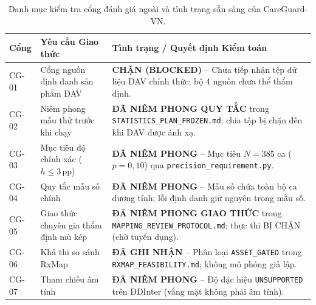 \documentclass[11pt]{article}
\begin{document}
\begin{table}[H]
\centering
\caption{Danh mục kiểm tra cổng đánh giá ngoài và tình trạng sẵn sàng của CareGuard-VN.}
\label{tab:gate_status_vi}
\small
\begin{tabularx}{\textwidth}{lp{4.2cm}X}
\toprule
\textbf{Cổng} & \textbf{Yêu cầu Giao thức} & \textbf{Tình trạng / Quyết định Kiểm toán} \\
\midrule
CG-01 & Cổng nguồn định danh sản phẩm DAV & \textbf{CHẶN (BLOCKED)} -- Chưa tiếp nhận tệp dữ liệu DAV chính thức; bộ 4 nguồn chưa thể thẩm định. \\
CG-02 & Niêm phong mẫu thử trước khi chạy & \textbf{ĐÃ NIÊM PHONG QUY TẮC} trong \texttt{STATISTICS\_PLAN\_FROZEN.md}; chia tập bị chặn đến khi DAV được ánh xạ. \\
CG-03 & Mục tiêu độ chính xác ($h \le 3\,\text{pp}$) & \textbf{ĐÃ NIÊM PHONG} -- Mục tiêu $N=385$ ca ($p=0{,}10$) qua \texttt{precision\_requirement.py}. \\
CG-04 & Quy tắc mẫu số chính & \textbf{ĐÃ NIÊM PHONG} -- Mẫu số chứa toàn bộ ca dương tính; lỗi định danh giữ nguyên trong mẫu số. \\
CG-05 & Giao thức chuyên gia thẩm định mù kép & \textbf{ĐÃ NIÊM PHONG GIAO THỨC} trong \texttt{MAPPING\_REVIEW\_PROTOCOL.md}; thực thi BỊ CHẶN (chờ tuyển dụng). \\
CG-06 & Khả thi so sánh RxMap & \textbf{ĐÃ GHI NHẬN} -- Phân loại \texttt{ASSET\_GATED} trong \texttt{RXMAP\_FEASIBILITY.md}; không mô phỏng giả lập. \\
CG-07 & Tham chiếu âm tính & \textbf{ĐÃ NIÊM PHONG} -- Độ đặc hiệu \texttt{UNSUPPORTED} trên DDInter (vắng mặt không phải âm tính). \\
\bottomrule
\end{tabularx}
\end{table}
\end{document}
